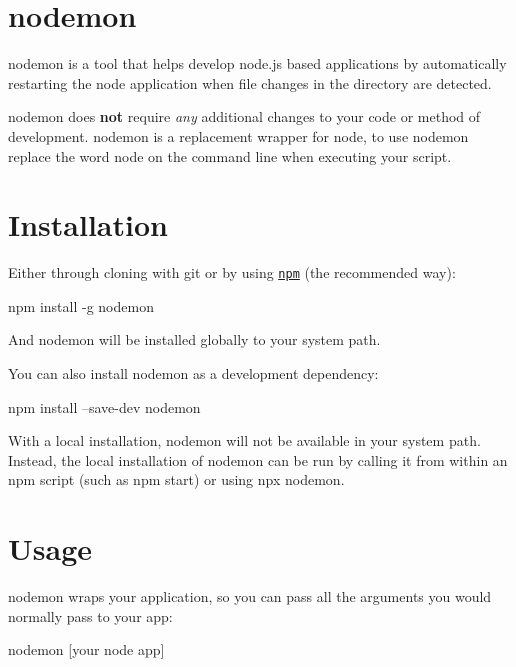 

\section*{nodemon}

nodemon is a tool that helps develop node.\+js based applications by automatically restarting the node application when file changes in the directory are detected.

nodemon does {\bfseries not} require {\itshape any} additional changes to your code or method of development. nodemon is a replacement wrapper for {\ttfamily node}, to use {\ttfamily nodemon} replace the word {\ttfamily node} on the command line when executing your script.

\href{https://npmjs.org/package/nodemon}{\tt } \href{https://travis-ci.org/remy/nodemon}{\tt } \href{#backers}{\tt } \href{#sponsors}{\tt }

\section*{Installation}

Either through cloning with git or by using \href{http://npmjs.org}{\tt npm} (the recommended way)\+:


\begin{DoxyCode}
npm install -g nodemon
\end{DoxyCode}


And nodemon will be installed globally to your system path.

You can also install nodemon as a development dependency\+:


\begin{DoxyCode}
npm install --save-dev nodemon
\end{DoxyCode}


With a local installation, nodemon will not be available in your system path. Instead, the local installation of nodemon can be run by calling it from within an npm script (such as {\ttfamily npm start}) or using {\ttfamily npx nodemon}.

\section*{Usage}

nodemon wraps your application, so you can pass all the arguments you would normally pass to your app\+:


\begin{DoxyCode}
nodemon [your node app]
\end{DoxyCode}


